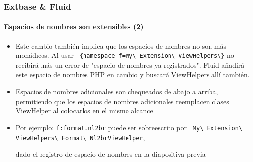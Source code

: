 
\begin{frame}[fragile]
	\frametitle{Extbase \& Fluid}
	\framesubtitle{Espacios de nombres son extensibles (2)}

	\begin{itemize}

		\item Este cambio también implica que los espacios de nombres no son más monádicos.\newline
			Al usar
			\texttt{
				\{namespace f=My\textbackslash
				Extension\textbackslash
				ViewHelpers\textbackslash\}}\newline
				no recibirá más un error de "espacio de nombres ya registrados".
				Fluid añadirá este espacio de nombres PHP en cambio y buscará ViewHelpers
				allí también.

		\item Espacios de nombres adicionales son chequeados de abajo a arriba, permitiendo que los
			espacios de nombres adicionales reemplacen clases ViewHelper al colocarlos en
			el mismo alcance

		\item Por ejemplo: \texttt{f:format.nl2br} puede ser sobreescrito por
			\texttt{
				My\textbackslash
				Extension\textbackslash
				ViewHelpers\textbackslash
				Format\textbackslash
				Nl2brViewHelper},

				dado el registro de espacio de nombres en la diapositiva previa

	\end{itemize}

\end{frame}


